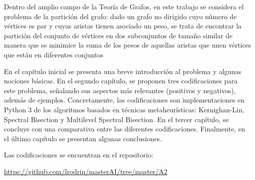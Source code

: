 Dentro del amplio campo de la Teoría de Grafos, en este trabajo se considera el problema de la partición del grafo: dado un grafo no dirigido cuyo número de vértices es par y cuyas aristas tienen asociado un peso, se trata de encontrar la partición del conjunto de vértices en dos subconjuntos de tamaño similar de manera que se minimice la suma de los pesos de aquellas aristas que unen vértices que están en diferentes conjuntos

En el capítulo inicial se presenta una breve introducción al problema y algunas nociones básicas. En el segundo capítulo, se proponen tres codificaciones para este problema, señalando sus aspectos más relevantes (positivos y negativos), además de ejemplos. Concretamente, las codificaciones son implementaciones en Python 3 de los algoritmos basados en técnicas metaheurísticas: Kernighan-Lin, Spectral Bisection y Multilevel Spectral Bisection. En el tercer capítulo, se concluye con una comparativa entre las diferentes codificaciones. Finalmente, en el último capítulo se presentan algunas conclusiones.

Las codificaciones se encuentran en el repositorio:

\begin{center}
	\url{https://github.com/lrodrin/masterAI/tree/master/A2}\label{GitHub}
\end{center}
